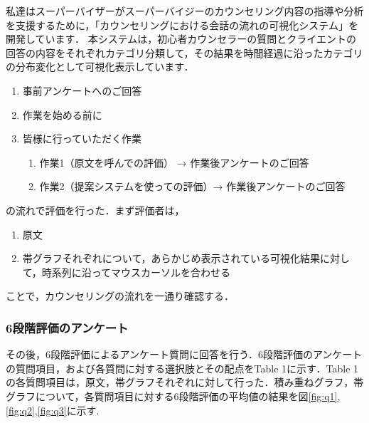 \documentclass[shuuron]{kuee}
\begin{document}
私達はスーパーバイザーがスーパーバイジーのカウンセリング内容の指導や分析を支援するために，「カウンセリングにおける会話の流れの可視化システム」を開発しています．
本システムは，初心者カウンセラーの質問とクライエントの回答の内容をそれぞれカテゴリ分類して，その結果を時間経過に沿ったカテゴリの分布変化として可視化表示しています．

\begin{enumerate}

  \item 事前アンケートへのご回答
  \item 作業を始める前に
  \item 皆様に行っていただく作業
  \begin{enumerate}
    \item 作業1（原文を呼んでの評価） → 作業後アンケートのご回答
    \item 作業2（提案システムを使っての評価）→ 作業後アンケートのご回答
  \end{enumerate}
\end{enumerate}


の流れで評価を行った．まず評価者は，
\begin{enumerate}

  \item 原文
  \item 帯グラフそれぞれについて，あらかじめ表示されている可視化結果に対して，時系列に沿ってマウスカーソルを合わせる
\end{enumerate}


ことで，カウンセリングの流れを一通り確認する．




\subsubsection{6段階評価のアンケート}

その後，6段階評価によるアンケート質問に回答を行う．6段階評価のアンケートの質問項目，および各質問に対する選択肢とその配点をTable 1に示す．Table 1の各質問項目は，原文，帯グラフそれぞれに対して行った．積み重ねグラフ，帯グラフについて，各質問項目に対する6段階評価の平均値の結果を図\ref{fig:q1},\ref{fig:q2},\ref{fig:q3}に示す.
\end{document}
